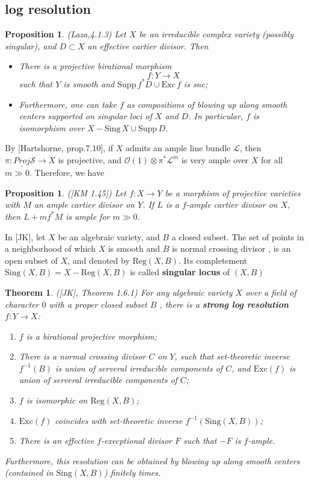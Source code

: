 \documentclass{article}
\newtheorem{prop}[defn]{Proposition}
\newtheorem{thm}[defn]{Theorem}
\begin{document}
\subsection{log resolution}
\begin{prop}
	(Laza,4.1.3) Let $ X $ be an irreducible complex variety (possibly singular), and $ D\subset X $ an effective cartier divisor. Then 
	\begin{itemize}
		\item There is a projective birational morphism 
		$$ f:Y\to X $$
		such that $ Y $ is smooth and $ \mathrm{Supp}\,f^*D\cup\mathrm{Exc}\,f $ is snc;
		\item Furthermore, one can take $ f $ as compositions of blowing up along smooth centers supported on singular loci of $ X $ and $ D $. In particular, $ f $ is isomorphism over $ X-\mathrm{Sing}\, X\cup \mathrm{Supp}\,D $.	
	\end{itemize}
\end{prop}
By [Hartshorne, prop.7.10],  if $ X $ admits an ample line bundle $ \mathcal{L} $, then  $\pi: \underline{Proj}\mathcal{S}\to X $ is projective, and $ \mathcal{O}(1)\otimes \pi^*\mathcal{L}^m $ is very ample over $ X $  for all $ m\gg 0 $. Therefore, we have 
\begin{prop}
	([KM 1.45]) Let $ f:X\to Y $ be a morphism of projective varieties with $ M $ an ample cartier divisor on $ Y $. If $ L $ is a $ f $-ample cartier divisor on $ X $, then $ L+mf^*M $ is ample for $ m\gg 0 $. 
\end{prop}

In [JK], let $ X $ be an algebraic variety, and $ B $ a closed subset. The set of points  in a neighborhood of which $ X $ is smooth and $ B $ is normal crossing divisor , is an open subset of $ X $, and denoted by $ \mathrm{Reg}(X,B) $. Its completement $ \mathrm{Sing}(X,B)=X-\mathrm{Reg}(X,B) $ is called \textbf{singular locus} of $ (X,B) $
\begin{thm}
	([JK], Theorem 1.6.1) For any algebraic variety $ X $ over a field of character $ 0 $ with a proper closed subset $ B $ , there is a \textbf{strong log resolution} $ f:Y\to X $:
	\begin{enumerate}
		\item $ f $ is a birational projective morphism;
		\item There is a normal crossing divisor $ C $ on $ Y $, such that set-theoretic inverse $ f^{-1}(B) $ is union of serveral irreducible components of $ C $, and $ \mathrm{Exc}(f) $ is union of serveral irreducible components of $ C $;
		\item $ f $ is isomorphic on $ \mathrm{Reg}(X,B) $;
		\item $ \mathrm{Exc}(f) $ coincides with set-theoretic inverse $ f^{-1}(\mathrm{Sing}(X,B)) $;
		\item There is  an effective  $ f $-execptional divisor $ F $ such that $ -F $ is $ f $-ample.
	\end{enumerate}
Furthermore, this resolution can be obtained by blowing up along smooth centers (contained in $ \mathrm{Sing}(X,B) $) finitely times.
\end{thm}
\end{document}
